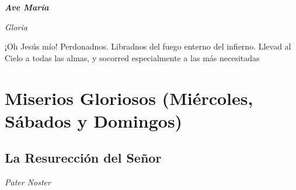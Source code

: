 \documentclass[a4paper,11pt, oneside]{report}
\begin{document}
      \textbf{\textit{Ave María}} \par
      \indent\textit{Gloria} \par
      \indent¡Oh Jesús mío! Perdonadnos. Libradnos del fuego enterno del infierno. Llevad al Cielo a todas las almas, y socorred especialmente a las más 
      necesitadas
        
  \section*{ Miserios Gloriosos (Miércoles, Sábados y Domingos)}
    \subsection*{ La Resurección del Señor }
      
      \textit{Pater Noster}
\end{document}
